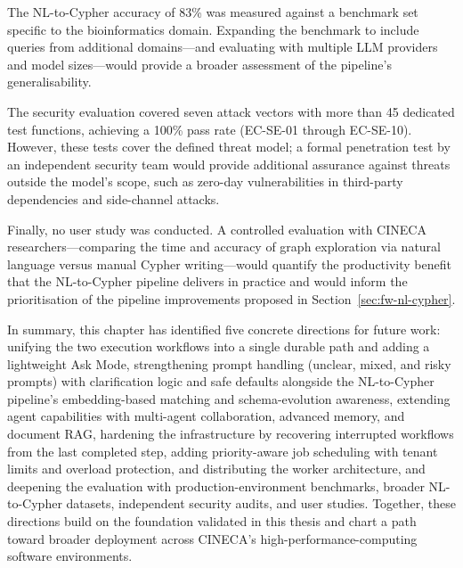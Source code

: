 \documentclass[a4paper,noexaminfo]{sapthesis}
\begin{document}
The NL-to-Cypher accuracy of 83\% was measured against a benchmark set
specific to the bioinformatics domain.  Expanding the benchmark to include
queries from additional domains---and evaluating with multiple LLM
providers and model sizes---would provide a broader assessment of the
pipeline's generalisability.

The security evaluation covered seven attack vectors with more than 45
dedicated test functions, achieving a 100\% pass rate (EC-SE-01 through
EC-SE-10).  However, these tests cover the defined threat model; a formal
penetration test by an independent security team would provide additional
assurance against threats outside the model's scope, such as zero-day
vulnerabilities in third-party dependencies and side-channel attacks.

Finally, no user study was conducted.  A controlled evaluation with
CINECA researchers---comparing the time and accuracy of graph exploration
via natural language versus manual Cypher writing---would quantify the
productivity benefit that the NL-to-Cypher pipeline delivers in practice
and would inform the prioritisation of the pipeline improvements proposed
in Section~\ref{sec:fw-nl-cypher}.

\bigskip
\noindent
In summary, this chapter has identified five concrete directions for
future work: unifying the two execution workflows into a single durable
path and adding a lightweight Ask Mode, strengthening prompt handling
(unclear, mixed, and risky prompts) with clarification logic and safe
defaults alongside the NL-to-Cypher pipeline's embedding-based matching
and schema-evolution awareness, extending agent capabilities
with multi-agent collaboration, advanced memory, and document RAG,
hardening the infrastructure by recovering interrupted workflows from
the last completed step, adding priority-aware job scheduling with
tenant limits and overload protection, and distributing the worker
architecture, and deepening the evaluation with production-environment
benchmarks, broader NL-to-Cypher datasets, independent security audits,
and user studies.  Together, these directions build on the foundation
validated in this thesis and chart a path toward broader deployment
across CINECA's high-performance-computing software environments.

\end{document}
